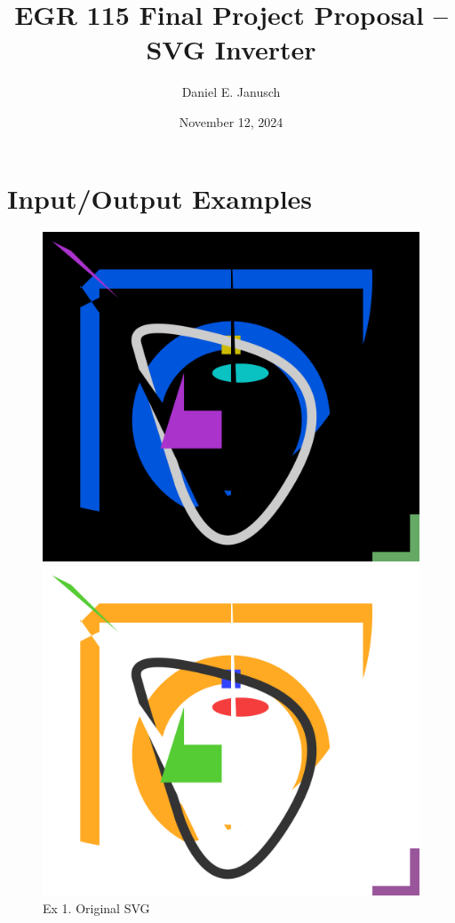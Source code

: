 \documentclass[12pt]{article}
\begin{document}

\title{EGR 115 Final Project Proposal {\bf–} SVG Inverter}
\author{Daniel E. Janusch}
\date{November 12, 2024}
\maketitle

\vspace{-30px}
\section{Input/Output Examples}

\begin{figure}[ht]
	\centering
	\begin{minipage}[b]{0.441\textwidth}
		\includegraphics[width=\textwidth]{./pdf/ex1-dark.pdf}
		\caption{Ex 1. Original SVG}
	\end{minipage}
	\hfill
	\begin{minipage}[b]{0.441\textwidth}
		\includegraphics[width=\textwidth]{./pdf/ex1-light.pdf}

\end{minipage}
\end{figure}
\end{document}
